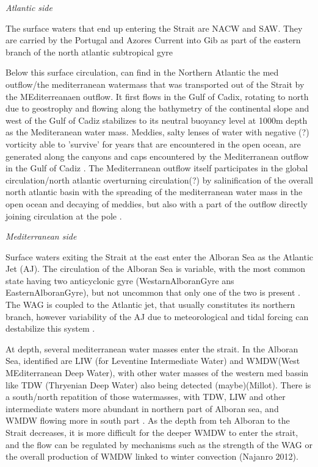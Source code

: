 \textit{Atlantic side}

The surface waters that end up entering the Strait are NACW and SAW\citep{millot_2014,naranjo_2015}. They are carried by the Portugal and Azores Current into Gib as part of the eastern branch of the north atlantic subtropical gyre \citep{barton_2001}

Below this surface circulation, can find in the Northern Atlantic the med outflow/the mediterranean watermass that was transported out of the Strait by the MEditerreanaen outflow. It first flows in the Gulf of Cadix, rotating to north due to geostrophy and flowing along the bathymetry of the continental slope\citep{price_1993,gasser_2017} and west of the Gulf of Cadiz stabilizes to its neutral buoyancy level at 1000m depth as the Mediteranean water mass\citep{price_1993}. Meddies, salty lenses of water with negative (?) vorticity able to 'survive' for years that are encountered in the open ocean, are generated along the canyons and caps encountered by the Mediterranean outflow in the Gulf of Cadiz \citep{bashmachnikov_2015}. The Mediterranean outflow itself participates in the global circulation/north atlantic overturning circulation(?) by salinification of the overall north atlantic basin with the spreading of the mediterranean water mass in the open ocean and decaying of meddies, but also with a part of the outflow directly joining circulation at the pole \citep{price_1993,jia_2007}.


\textit{Mediterranean side}


Surface waters exiting the Strait at the east enter the Alboran Sea as the Atlantic Jet (AJ). The circulation of the Alboran Sea is variable, with the most common state having two anticyclonic gyre (WestarnAlboranGyre ans EasternAlboranGyre), but not uncommon that only one of the two is present \citep{millot_2005}. The WAG is coupled to the Atlantic jet, that usually constitutes its northern branch, however variability of the AJ due to meteorological and tidal forcing can destabilize this system \citep{sanchez-garrido_2013,lorente_2019}.

At depth, several mediterranean water masses enter the strait. In the Alboran Sea, identified are LIW (for Leventine Intermediate Water) and WMDW(West MEditerranean Deep Water), with other water masses of the western med bassin like TDW (Thryenian Deep Water) also being detected (maybe)(Millot). There is a south/north repatition of those watermasses, with TDW, LIW and other intermediate waters more abundant in northern part of Alboran sea, and WMDW flowing more in south part \citep{millot_2014}. As the depth from teh Alboran to the Strait decreases, it is more difficult for the deeper WMDW to enter the strait, and the flow can be regulated by mechanisms such as the strength of the WAG or the overall production of WMDW linked to winter convection (Najanro 2012).


